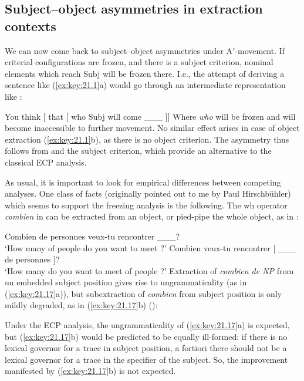 \documentclass[output=paper]{langsci/langscibook}
\begin{document}
\begin{exe}
\section{Subject--object asymmetries in extraction contexts}

We can now come back to subject--object asymmetries under A$'$-movement. If
criterial configurations are frozen, and there is a subject criterion, nominal
elements which reach Subj will be frozen there. I.e., the attempt of deriving a
sentence like (\ref{ex:key:21.1}a) would go through an intermediate
representation like :

\ea%
    \label{ex:key:21.15}
    You think [ that [ who Subj\tss{[+N]} will come \_\_\_ ]]
\z
%
Where \emph{who} will be frozen and will become inaccessible to further
movement. No similar effect arises in case of object extraction
(\ref{ex:key:21.1}b), as there is no object criterion. The asymmetry thus
follows from  and the subject criterion, which provide an
alternative to the classical \gls{ECP} analysis.

As usual, it is important to look for empirical differences between competing
analyses. One class of facts (originally pointed out to me by Paul
Hirschbühler) which seems to support the freezing analysis is the following.
The wh operator \emph{combien} in  can be extracted from an object,
or pied-pipe the whole object, as in :

\ea%
    \label{ex:key:21.16}
    \ea Combien de personnes veux-tu rencontrer \_\_\_?\\
        ‘How many of people do you want to meet ?’
    \ex Combien veux-tu rencontrer [ \_\_\_ de personnes ]?\\
        ‘How many do you want to meet of people ?’
    \z
\z
%
Extraction of \emph{combien de NP} from un embedded subject position gives rise
to ungrammaticality (as in (\ref{ex:key:21.17}a)), but subextraction of
\emph{combien} from subject position is only mildly degraded, as in
(\ref{ex:key:21.17}b) (\citealt{Obenauer1976,Kayne1984}):

\ea%
    \label{ex:key:21.17}
    \z
\z
%
Under the \gls{ECP} analysis, the ungrammaticality of (\ref{ex:key:21.17}a) is
expected, but (\ref{ex:key:21.17}b) would be predicted to be equally ill-formed:
if there is no lexical governor for a trace in subject position, a fortiori
there should not be a lexical governor for a trace in the specifier of the
subject. So, the improvement manifested by (\ref{ex:key:21.17}b) is not expected.


\end{exe}
\end{document}
